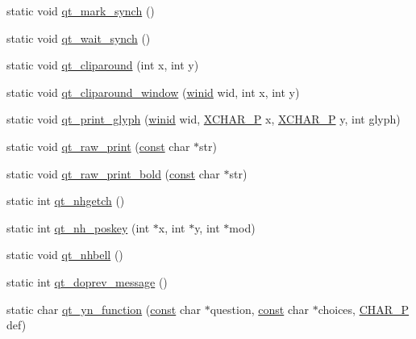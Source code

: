 \begin{DoxyCompactItemize}
\item 
static void \hyperlink{classNetHackQtBind_a76fd734b00c7525dc1cff8d517d3e1fb}{qt\+\_\+mark\+\_\+synch} ()
\item 
static void \hyperlink{classNetHackQtBind_a7e8a412e633e9570d5db00c288ace2f5}{qt\+\_\+wait\+\_\+synch} ()
\item 
static void \hyperlink{classNetHackQtBind_a2a7b175a5e6521c6097ceecc49cc7b93}{qt\+\_\+cliparound} (int x, int y)
\item 
static void \hyperlink{classNetHackQtBind_aaf3e73e76f3272dd9bfb41f19aa0726b}{qt\+\_\+cliparound\+\_\+window} (\hyperlink{wintype_8h_adc2de956a3f084b1691cf080e1d1412b}{winid} wid, int x, int y)
\item 
static void \hyperlink{classNetHackQtBind_a04ddf995503c855f6818c5d579c5a8ee}{qt\+\_\+print\+\_\+glyph} (\hyperlink{wintype_8h_adc2de956a3f084b1691cf080e1d1412b}{winid} wid, \hyperlink{wingem1_8c_abea04566e20888dd08f477de5f4b9289}{X\+C\+H\+A\+R\+\_\+\+P} x, \hyperlink{wingem1_8c_abea04566e20888dd08f477de5f4b9289}{X\+C\+H\+A\+R\+\_\+\+P} y, int glyph)
\item 
static void \hyperlink{classNetHackQtBind_a787d9069156900c2aec7618ff0b84d22}{qt\+\_\+raw\+\_\+print} (\hyperlink{tradstdc_8h_a2c212835823e3c54a8ab6d95c652660e}{const} char $\ast$str)
\item 
static void \hyperlink{classNetHackQtBind_a66c2209fe0ea76c9cb969024831d28b8}{qt\+\_\+raw\+\_\+print\+\_\+bold} (\hyperlink{tradstdc_8h_a2c212835823e3c54a8ab6d95c652660e}{const} char $\ast$str)
\item 
static int \hyperlink{classNetHackQtBind_a00ab449482788251804e0a68d899350d}{qt\+\_\+nhgetch} ()
\item 
static int \hyperlink{classNetHackQtBind_a2ec208ac4c9ac0b02f6336a95fe6c534}{qt\+\_\+nh\+\_\+poskey} (int $\ast$x, int $\ast$y, int $\ast$mod)
\item 
static void \hyperlink{classNetHackQtBind_ae2df8a4e4d99bb3859326b224febc091}{qt\+\_\+nhbell} ()
\item 
static int \hyperlink{classNetHackQtBind_a53c5fdb1a5b65960f5d251150041568f}{qt\+\_\+doprev\+\_\+message} ()
\item 
static char \hyperlink{classNetHackQtBind_a5d1b55de585c31624d02d1891ba7c97f}{qt\+\_\+yn\+\_\+function} (\hyperlink{tradstdc_8h_a2c212835823e3c54a8ab6d95c652660e}{const} char $\ast$question, \hyperlink{tradstdc_8h_a2c212835823e3c54a8ab6d95c652660e}{const} char $\ast$choices, \hyperlink{wingem1_8c_ada878a8b4864a1658ee0f0acd5a89412}{C\+H\+A\+R\+\_\+\+P} def)

\end{DoxyCompactItemize}
